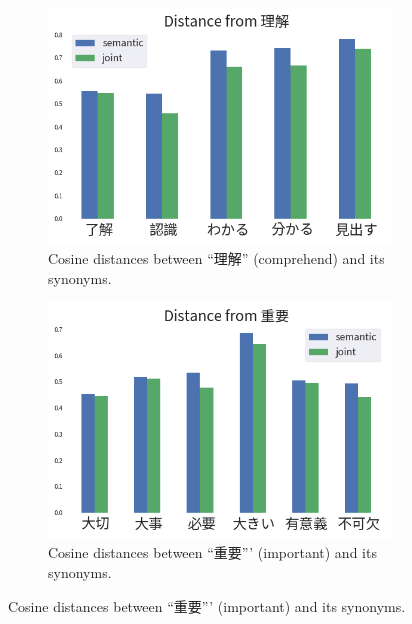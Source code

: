 \begin{CJK}{UTF8}{ipxm}
    \begin{figure}[h]
        \centering
        \begin{subfigure}[b]{0.45\textwidth}
            \centering
            \includegraphics[width=\textwidth]{../images/similarity_ja1.png}
            \caption{Cosine distances between ``理解'' (comprehend) and its synonyms.}
            \label{fig:similarity_ja1}
        \end{subfigure}
        \hspace{2em}
        \begin{subfigure}[b]{0.45\textwidth}
            \centering
            \includegraphics[width=\textwidth]{../images/similarity_ja2.png}
            \caption{Cosine distances between ``重要''' (important) and its synonyms.}
            \label{fig:similarity_ja2}
        \end{subfigure}
        

\end{figure}
\end{CJK}
